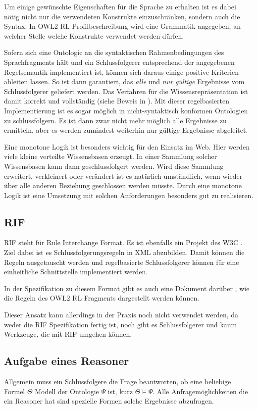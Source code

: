 Um einige gewünschte Eigenschaften für die Sprache zu erhalten ist es dabei nötig nicht nur die verwendeten Konstrukte einzuschränken, sondern auch die Syntax. In OWL2 RL Profilbeschreibung wird eine Grammatik angegeben, an welcher Stelle welche Konstrukte verwendet werden dürfen.

Sofern sich eine Ontologie an die syntaktischen Rahmenbedingungen des Sprachfragments hält und ein Schlussfolgerer entsprechend der angegebenen Regelsemantik implementiert ist, können sich daraus einige positive Kriterien ableiten lassen. So ist dann garantiert, das \emph{alle} und \emph{nur gültige} Ergebnisse vom Schlussfolgerer geliefert werden. Das Verfahren für die Wissensrepräsentation ist damit korrekt und vollständig (siehe Beweis in \cite{OWL2Profiles}).
Mit dieser regelbasierten Implementierung ist es sogar möglich in nicht-syntaktisch konformen Ontologien zu schlussfolgern. Es ist dann zwar nicht mehr möglich alle Ergebnisse zu ermitteln, aber es werden zumindest weiterhin nur gültige Ergebnisse abgeleitet.

Eine monotone Logik ist besonders wichtig für den Einsatz im Web. Hier werden viele kleine verteilte Wissensbasen erzeugt. In einer Sammlung solcher Wissensbasen kann dann geschlussfolgert werden. Wird diese Sammlung erweitert, verkleinert oder verändert ist es natürlich umständlich, wenn wieder über alle anderen Beziehung geschlossen werden müsste. Durch eine monotone Logik ist eine Umsetzung mit solchen Anforderungen besonders gut zu realisieren.


\subsection{RIF}
\label{abschnitt-rif}
RIF steht für Rule Interchange Format. Es ist ebenfalls ein Projekt des W3C \cite{RIF2005}. Ziel dabei ist es Schlussfolgerungsregeln in XML abzubilden. Damit können die Regeln ausgetauscht werden und regelbasierte Schlussfolgerer können für eine einheitliche Schnittstelle implementiert werden.

In der Spezifikation zu diesem Format gibt es auch eine Dokument darüber \cite{Reynolds2009}, wie die Regeln des OWL2 RL Fragments dargestellt werden können.

Dieser Ansatz kann allerdings in der Praxis noch nicht verwendet werden, da weder die RIF Spezifikation fertig ist, noch gibt es Schlussfolgerer und kaum Werkzeuge, die mit RIF umgehen können.


\subsection{Aufgabe eines Reasoner}
Allgemein muss ein Schlussfolgere die Frage beantworten, ob eine beliebige Formel $\Theta$ Modell der Ontologie $\Psi$ ist, kurz $\Theta \models \Psi$. Alle Anfragemöglichkeiten die ein Reasoner hat sind spezielle Formen solche Ergebnisse abzufragen.

